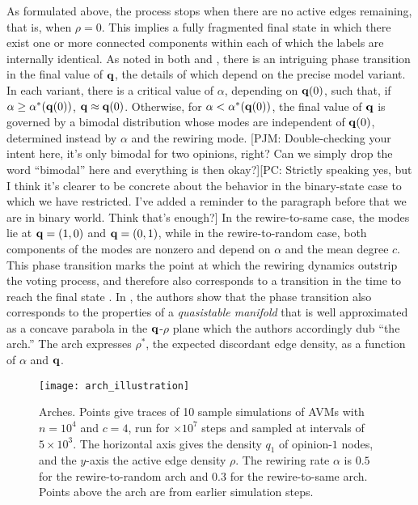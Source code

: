 \documentclass[review, onefignum, onetabnum]{siamart171218}
\newcommand{\pjm}[1]{{\color{blue}[PJM: #1]}}
\newcommand{\pc}[1]{{\color{comment_purple}[PC: #1]}}
\begin{document}
	As formulated above, the process stops when there are no active edges remaining, that is, when $\rho = 0$. This implies a fully fragmented final state in which there exist one or more connected components within each of which the labels are internally identical. 
	As noted in both \cite{Holme2006} and \cite{Durrett2012}, there is an intriguing phase transition in the final value of $\mathbf{q}$, the details of which depend on the precise model variant. 
	In each variant, there is a critical value of $\alpha$, depending on $\mathbf{q}(0)$, such that, if $\alpha \geq \alpha^*(\mathbf{q}(0))$, $\mathbf{q} \approx \mathbf{q}(0)$. 
	Otherwise, for $\alpha < \alpha^*(\mathbf{q}(0))$, the final value of $\mathbf{q}$ is governed by a bimodal distribution whose modes are independent of $\mathbf{q}(0)$, determined instead by $\alpha$ and the rewiring mode. \pjm{Double-checking your intent here, it's only bimodal for two opinions, right? Can we simply drop the word ``bimodal'' here and everything is then okay?}\pc{Strictly speaking yes, but I think it's clearer to be concrete about the behavior in the binary-state case to which we have restricted. I've added a reminder to the paragraph before that we are in binary world. Think that's enough?}
	In the rewire-to-same case, the modes lie at $\mathbf{q} = (1,0)$ and $\mathbf{q} = (0,1)$, while in the rewire-to-random case, both components of the modes are nonzero and depend on $\alpha$ and the mean degree $c$. 
	This phase transition marks the point at which the rewiring dynamics outstrip the voting process, and therefore also corresponds to a transition in the time to reach the final state \cite{Holme2006,Rogers2013}. 
	In \cite{Durrett2012}, the authors show that the phase transition also corresponds to the properties of a \emph{quasistable manifold} that is well approximated as a concave parabola in the $\mathbf{q}$-$\rho$ plane which the authors accordingly dub ``the arch.'' 
	The arch expresses $\rho^*$, the expected discordant edge density, as a function of $\alpha$ and $\mathbf{q}$. 
	\begin{figure}
	 	\centering
	 	\texttt{[image: arch\_illustration]}
	 	\caption{Arches. 
	 	Points give traces of 10 sample simulations of AVMs with $n = 10^4$ and $c = 4$, run for $\times 10^7$ steps and sampled at intervals of $5\times 10^3$. 
	 	The horizontal axis gives the density $q_1$ of opinion-$1$ nodes, and the $y$-axis the active edge density $\rho$. 
	 	The rewiring rate $\alpha$ is $0.5$ for the rewire-to-random arch and $0.3$ for the rewire-to-same arch.
	 	Points above the arch are from earlier simulation steps.} \label{fig:arch_illustration}
	\end{figure} 
\end{document}
